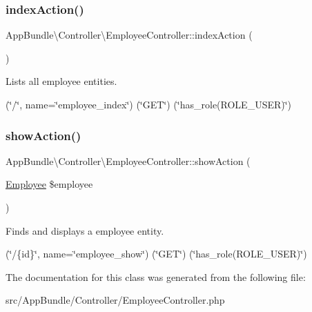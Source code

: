 \subsubsection{\texorpdfstring{index\+Action()}{indexAction()}}
{\footnotesize\ttfamily App\+Bundle\textbackslash{}\+Controller\textbackslash{}\+Employee\+Controller\+::index\+Action (\begin{DoxyParamCaption}{ }\end{DoxyParamCaption})}

Lists all employee entities.

(\char`\"{}/\char`\"{}, name=\char`\"{}employee\+\_\+index\char`\"{}) (\char`\"{}\+G\+E\+T\char`\"{}) (\char`\"{}has\+\_\+role(\textquotesingle{}\+R\+O\+L\+E\+\_\+\+U\+S\+E\+R\textquotesingle{})\char`\"{}) \mbox{\label{class_app_bundle_1_1_controller_1_1_employee_controller_a7392ff83d0857c8e8ee5e3a8707ce4cf}} 
\subsubsection{\texorpdfstring{show\+Action()}{showAction()}}
{\footnotesize\ttfamily App\+Bundle\textbackslash{}\+Controller\textbackslash{}\+Employee\+Controller\+::show\+Action (\begin{DoxyParamCaption}\item[{\mbox{\hyperlink{class_app_bundle_1_1_entity_1_1_employee}{Employee}}}]{\$employee }\end{DoxyParamCaption})}

Finds and displays a employee entity.

(\char`\"{}/\{id\}\char`\"{}, name=\char`\"{}employee\+\_\+show\char`\"{}) (\char`\"{}\+G\+E\+T\char`\"{}) (\char`\"{}has\+\_\+role(\textquotesingle{}\+R\+O\+L\+E\+\_\+\+U\+S\+E\+R\textquotesingle{})\char`\"{}) 

The documentation for this class was generated from the following file\+:\begin{DoxyCompactItemize}
\item 
src/\+App\+Bundle/\+Controller/Employee\+Controller.\+php\end{DoxyCompactItemize}
